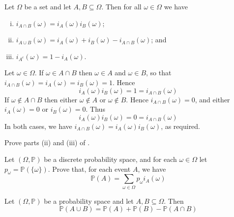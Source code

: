 \begin{proposition}
\label{propIndicatorFunctionSetOperations}
Let $\Omega$ be a set and let $A,B \subseteq \Omega$. Then for all $\omega \in \Omega$ we have
\begin{enumerate}[(i)]
\item $i_{A \cap B}(\omega) = i_A(\omega)i_B(\omega)$;
\item $i_{A \cup B}(\omega) = i_A(\omega) + i_B(\omega) - i_{A \cap B}(\omega)$; and
\item $i_{A^c}(\omega) = 1 - i_A(\omega)$.
\end{enumerate}
\end{proposition}

\begin{cproof}[of (i)]
Let $\omega \in \Omega$. If $\omega \in A \cap B$ then $\omega \in A$ and $\omega \in B$, so that $i_{A \cap B}(\omega) = i_A(\omega) = i_B(\omega) = 1$. Hence
\[ i_A(\omega)i_B(\omega) = 1 = i_{A \cap B}(\omega) \]
If $\omega \not \in A \cap B$ then either $\omega \not \in A$ or $\omega \not \in B$. Hence $i_{A \cap B}(\omega) = 0$, and either $i_A(\omega) = 0$ or $i_B(\omega) = 0$. Thus
\[ i_A(\omega) i_B(\omega) = 0 = i_{A \cap B}(\omega) \]
In both cases, we have $i_{A \cap B}(\omega) = i_A(\omega)i_B(\omega)$, as required.
\end{cproof}

\begin{exercise}
Prove parts (ii) and (iii) of .
\end{exercise}

\begin{exercise}
\label{exProbabilityWithIndicatorFunction}
Let $(\Omega, \mathbb{P})$ be a discrete probability space, and for each $\omega \in \Omega$ let $p_{\omega} = \mathbb{P}(\{\omega\})$. Prove that, for each event $A$, we have
\[ \mathbb{P}(A) = \sum_{\omega \in \Omega} p_{\omega}i_A(\omega) \]
\end{exercise}

\begin{theorem}
\label{thmProbabilityOfUnion}
Let $(\Omega,\mathbb{P})$ be a probability space and let $A,B \subseteq \Omega$. Then
\[ \mathbb{P}(A \cup B) = \mathbb{P}(A) + \mathbb{P}(B) - \mathbb{P}(A \cap B) \]
\end{theorem}


